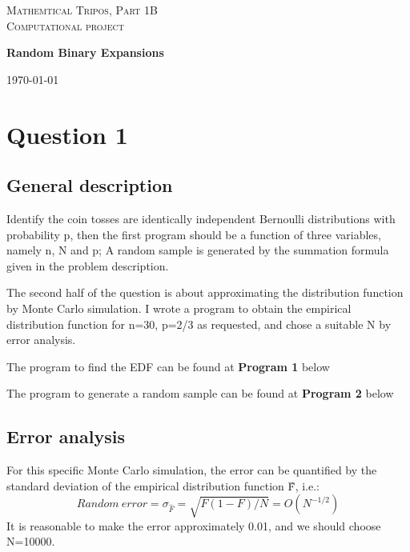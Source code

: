 \documentclass[11pt]{article}
\begin{document}
\begin{titlepage} %
	
	\center %
	
	\vspace*{8cm}
	\vfill\vfill
	\textsc{Mathemtical Tripos, Part 1B}\\
	\textsc{Computational project}
	\begin{center}
      {\huge\bfseries Random Binary Expansions}\\[0.4cm]
     \end{center}
	
	\vfill
	
	
	
	
	\vspace*{\fill}
	\vfill\vfill\vfill %
	
	{\large\today} %
	\vfill
\end{titlepage}


\section*{Question 1}
\subsection*{General description}
Identify the coin tosses are identically independent Bernoulli distributions with probability p, then the first program should be a function of three variables, namely n, N and p; A random sample is generated by the summation formula given in the problem description. 

The second half of the question is about approximating the distribution function by Monte Carlo simulation. I wrote a program to obtain the empirical distribution function for n=30, p=2/3 as requested, and chose a suitable N by error analysis. 

The program to find the EDF can be found at \textbf{Program 1} below

The program to generate a random sample can be found at \textbf{Program 2} below


\subsection*{Error analysis}
For this specific Monte Carlo simulation, the error can be quantified by the standard deviation of the empirical distribution function \^{F}, i.e.:
\begin{equation}
Random\ error =\sigma_{\hat{F}} =  \sqrt{F(1-F)/N}=O(N^{-1/2})
\end{equation}
It is reasonable to make the error approximately 0.01, and we should choose N=10000.
\end{document}
